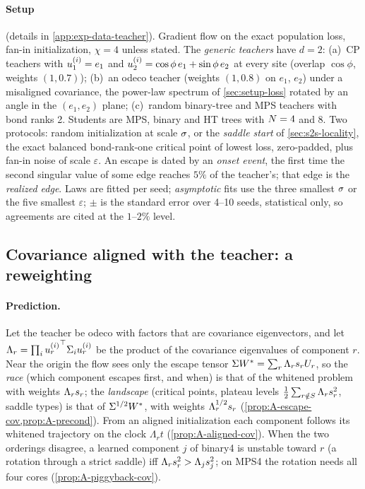 \paragraph{Setup} (details in \cref{app:exp-data-teacher}).
Gradient flow on the exact population loss, fan-in initialization, $\chi=4$ unless stated. The
\emph{generic teachers} have $d=2$: (a)~CP teachers with $u_{1}^{(i)}=e_1$ and $u_{2}^{(i)}=\cos\phi\,e_1+\sin\phi\,e_2$
at every site (overlap $\cos\phi$, weights $(1,0.7)$); (b)~an odeco teacher (weights $(1,0.8)$ on $e_1$, $e_2$)
under a misaligned covariance, the power-law spectrum of \cref{sec:setup-loss} rotated by an angle in the
$(e_1,e_2)$ plane; (c)~random binary-tree and MPS teachers with bond ranks 2. Students are MPS, binary and
HT trees with $N=4$ and $8$. Two protocols: random initialization at scale $\sigma$, or the \emph{saddle
start} of \cref{sec:s2s-locality}, the exact balanced bond-rank-one critical point of lowest loss,
zero-padded, plus fan-in noise of scale $\varepsilon$. An escape is dated by an \emph{onset event}, the first
time the second singular value of some edge reaches $5\%$ of the teacher's; that edge is the
\emph{realized edge}. Laws are fitted per seed; \emph{asymptotic} fits use the three smallest $\sigma$ or the
five smallest $\varepsilon$; $\pm$ is the standard error over 4--10 seeds, statistical only, so agreements are
cited at the $1$--$2\%$ level.

\subsection{Covariance aligned with the teacher: a reweighting}\label{sec:cov-aligned}

\paragraph{Prediction.}
Let the teacher be odeco with factors that are covariance eigenvectors, and let
$\Lambda_r=\prod_i{u_{r}^{(i)}}^{\top}\Sigma_{i}u_{r}^{(i)}$ be the product of the covariance eigenvalues of component $r$. Near
the origin the flow sees only the escape tensor $\Sigma W^{*}=\sum_r\Lambda_rs_{r}U_{r}$, so the \emph{race} (which
component escapes first, and when) is that of the whitened problem with weights $\Lambda_rs_{r}$; the
\emph{landscape} (critical points, plateau levels $\frac12\sum_{r\notin S}\Lambda_rs_{r}^2$, saddle types) is that
of $\Sigma^{1/2}W^{*}$, with weights $\Lambda_r^{1/2}s_{r}$ \derived{} (\cref{prop:A-escape-cov,prop:A-precond}). From an
aligned initialization each component follows its whitened trajectory on the clock $\Lambda_rt$ \proven{}
 (\cref{prop:A-aligned-cov}). When the two orderings disagree, a learned component $j$ of binary4 is
unstable toward $r$ (a rotation through a strict saddle) iff $\Lambda_rs_{r}^2>\Lambda_js_{j}^2$; on MPS4 the
rotation needs all four cores \proven{}  (\cref{prop:A-piggyback-cov}).

